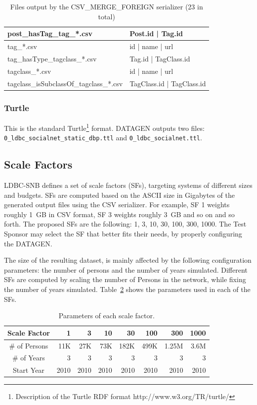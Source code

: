 \begin{table}[htbp]
{\begin{tabular}{|p{4.3cm}|p{12.4cm}|}
        \hline
        post\_hasTag\_tag\_*.csv & Post.id | Tag.id \\
        \hline
        tag\_*.csv & id | name | url \\
        \hline
        tag\_hasType\_tagclass\_*.csv & Tag.id | TagClass.id \\
        \hline
        tagclass\_*.csv & id | name | url \\
        \hline
        tagclass\_isSubclassOf\_tagclass\_*.csv & TagClass.id | TagClass.id \\
        \hline
    \end{tabular}}
    \caption{Files output by the CSV\_MERGE\_FOREIGN serializer (23 in total)}
    \label{table:csv_merge_foreign}
\end{table}

\subsubsection{Turtle}

This is the standard Turtle\footnote{Description of
the Turtle RDF format http://www.w3.org/TR/turtle/} format. DATAGEN outputs
two files: \texttt{0\_ldbc\_socialnet\_static\_dbp.ttl} and \texttt{0\_ldbc\_socialnet.ttl}.

\subsection{Scale Factors}

LDBC-SNB defines a set of scale factors (SFs), targeting systems of different
sizes and budgets.  SFs are computed based on the ASCII size in Gigabytes of
the generated output files using the CSV serializer. For example, SF 1 weights roughly 1~GB in CSV
format, SF 3 weights roughly 3~GB and so on and so forth.  The proposed SFs are
the following: 1, 3, 10, 30, 100, 300, 1000. The Test Sponsor may select the SF
that better fits their needs, by properly configuring the DATAGEN.

The size of the resulting dataset, is mainly affected by the following
configuration parameters: the number of persons and the number of years
simulated. Different SFs are computed by scaling the number of Persons in
the network, while fixing the number of years simulated.
Table~\ref{tab:snsize} shows the parameters used in each of the SFs.

\begin{table}[H]
\centering
\begin{tabular}{|c||r|r|r|r|r|r|r|}
\hline  Scale Factor  & 1 &  3 & 10 & 30 & 100 & 300 & 1000 \\
\hline  \# of Persons  & 11K &  27K & 73K & 182K & 499K & 1.25M & 3.6M \\
\hline  \# of Years  & 3 &  3 & 3 & 3 & 3 & 3 & 3 \\
\hline  Start Year & 2010 &  2010 & 2010 & 2010 & 2010 & 2010 & 2010 \\
\hline
\end{tabular}
\centering
\caption{Parameters of each scale factor.}
\label{tab:snsize}
\end{table}


